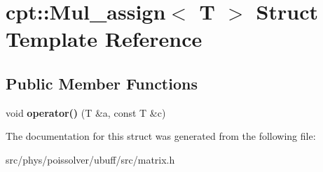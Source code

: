 \hypertarget{structcpt_1_1Mul__assign}{}\section{cpt\+:\+:Mul\+\_\+assign$<$ T $>$ Struct Template Reference}
\label{structcpt_1_1Mul__assign}
\subsection*{Public Member Functions}
\begin{DoxyCompactItemize}
\item 
void {\bfseries operator()} (T \&a, const T \&c)\hypertarget{structcpt_1_1Mul__assign_ac55c2f34e8deabd7ac532dd4f83f15df}{}\label{structcpt_1_1Mul__assign_ac55c2f34e8deabd7ac532dd4f83f15df}

\end{DoxyCompactItemize}


The documentation for this struct was generated from the following file\+:\begin{DoxyCompactItemize}
\item 
src/phys/poissolver/ubuff/src/matrix.\+h\end{DoxyCompactItemize}
